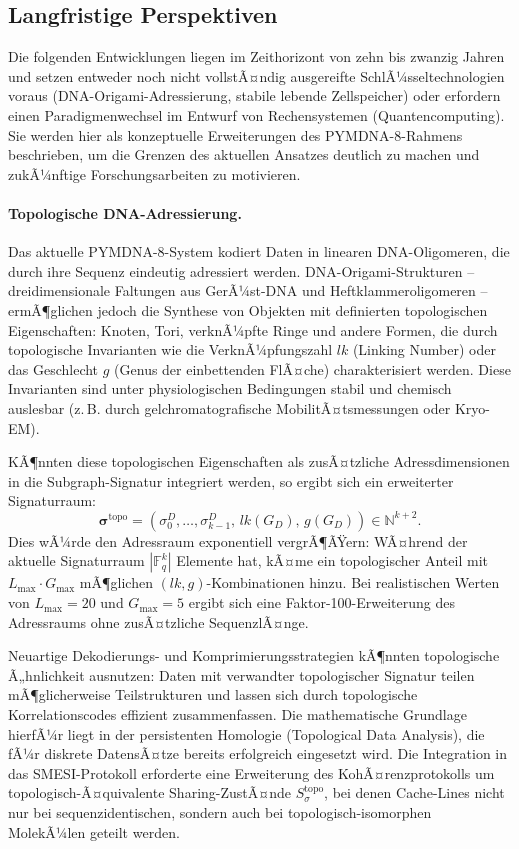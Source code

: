 ﻿\documentclass[a4paper,12pt]{article}
\theoremstyle{definition}
\begin{document}
\subsection{Langfristige Perspektiven}

Die folgenden Entwicklungen liegen im Zeithorizont von zehn bis zwanzig Jahren und setzen entweder noch nicht vollstÃ¤ndig ausgereifte SchlÃ¼sseltechnologien voraus (DNA-Origami-Adressierung, stabile lebende Zellspeicher) oder erfordern einen Paradigmenwechsel im Entwurf von Rechensystemen (Quantencomputing). Sie werden hier als konzeptuelle Erweiterungen des PYMDNA-8-Rahmens beschrieben, um die Grenzen des aktuellen Ansatzes deutlich zu machen und zukÃ¼nftige Forschungsarbeiten zu motivieren.

\paragraph{Topologische DNA-Adressierung.}
Das aktuelle PYMDNA-8-System kodiert Daten in linearen DNA-Oligomeren, die durch ihre Sequenz eindeutig adressiert werden. DNA-Origami-Strukturen -- dreidimensionale Faltungen aus GerÃ¼st-DNA und Heftklammeroligomeren -- ermÃ¶glichen jedoch die Synthese von Objekten mit definierten topologischen Eigenschaften: Knoten, Tori, verknÃ¼pfte Ringe und andere Formen, die durch topologische Invarianten wie die VerknÃ¼pfungszahl $lk$ (Linking Number) oder das Geschlecht $g$ (Genus der einbettenden FlÃ¤che) charakterisiert werden. Diese Invarianten sind unter physiologischen Bedingungen stabil und chemisch auslesbar (z.\,B. durch gelchromatografische MobilitÃ¤tsmessungen oder Kryo-EM).

KÃ¶nnten diese topologischen Eigenschaften als zusÃ¤tzliche Adressdimensionen in die Subgraph-Signatur integriert werden, so ergibt sich ein erweiterter Signaturraum:
\begin{equation}
  \boldsymbol{\sigma}^{\mathrm{topo}} = (\sigma_0^D, \ldots, \sigma_{k-1}^D,
  \, lk(G_D), \, g(G_D)) \in \mathbb{N}^{k+2}.
\end{equation}
Dies wÃ¼rde den Adressraum exponentiell vergrÃ¶ÃŸern: WÃ¤hrend der aktuelle Signaturraum $|\mathbb{F}_q^k|$ Elemente hat, kÃ¤me ein topologischer Anteil mit $L_{\max} \cdot G_{\max}$ mÃ¶glichen $(lk, g)$-Kombinationen hinzu. Bei realistischen Werten von $L_{\max} = 20$ und $G_{\max} = 5$ ergibt sich eine Faktor-100-Erweiterung des Adressraums ohne zusÃ¤tzliche SequenzlÃ¤nge.

Neuartige Dekodierungs- und Komprimierungsstrategien kÃ¶nnten topologische Ã„hnlichkeit ausnutzen: Daten mit verwandter topologischer Signatur teilen mÃ¶glicherweise Teilstrukturen und lassen sich durch topologische Korrelationscodes effizient zusammenfassen. Die mathematische Grundlage hierfÃ¼r liegt in der persistenten Homologie (Topological Data Analysis), die fÃ¼r diskrete DatensÃ¤tze bereits erfolgreich eingesetzt wird. Die Integration in das SMESI-Protokoll erforderte eine Erweiterung des KohÃ¤renzprotokolls um topologisch-Ã¤quivalente Sharing-ZustÃ¤nde $S_\sigma^{\mathrm{topo}}$, bei denen Cache-Lines nicht nur bei sequenzidentischen, sondern auch bei topologisch-isomorphen MolekÃ¼len geteilt werden.
\end{document}

